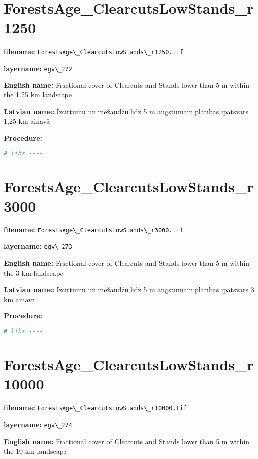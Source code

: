 \documentclass[
]{book}
\newcommand{\passthrough}[1]{#1}
\begin{document}
\section{ForestsAge\_ClearcutsLowStands\_r1250}\label{ch06.272}

\textbf{filename:} \passthrough{\lstinline!ForestsAge\_ClearcutsLowStands\_r1250.tif!}

\textbf{layername:} \passthrough{\lstinline!egv\_272!}

\textbf{English name:} Fractional cover of Clearcuts and Stands lower than 5 m within the 1.25 km landscape

\textbf{Latvian name:} Izcirtumu un mežaudžu līdz 5 m augstumam platības īpatsvars 1,25 km ainavā

\textbf{Procedure:}

\begin{lstlisting}[language=R]
# libs ----
\end{lstlisting}

\section{ForestsAge\_ClearcutsLowStands\_r3000}\label{ch06.273}

\textbf{filename:} \passthrough{\lstinline!ForestsAge\_ClearcutsLowStands\_r3000.tif!}

\textbf{layername:} \passthrough{\lstinline!egv\_273!}

\textbf{English name:} Fractional cover of Clearcuts and Stands lower than 5 m within the 3 km landscape

\textbf{Latvian name:} Izcirtumu un mežaudžu līdz 5 m augstumam platības īpatsvars 3 km ainavā

\textbf{Procedure:}

\begin{lstlisting}[language=R]
# libs ----
\end{lstlisting}

\section{ForestsAge\_ClearcutsLowStands\_r10000}\label{ch06.274}

\textbf{filename:} \passthrough{\lstinline!ForestsAge\_ClearcutsLowStands\_r10000.tif!}

\textbf{layername:} \passthrough{\lstinline!egv\_274!}

\textbf{English name:} Fractional cover of Clearcuts and Stands lower than 5 m within the 10 km landscape
\end{document}
